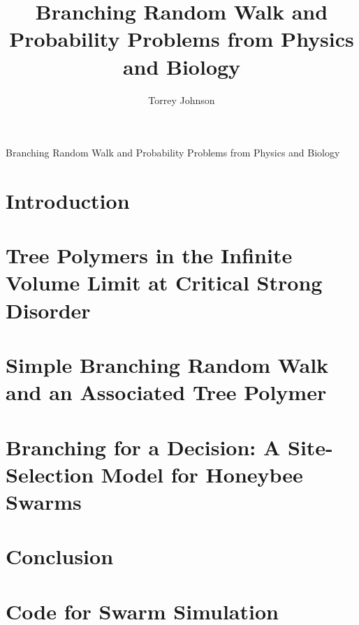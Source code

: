 \documentclass[double,12pt]{beavtex}
\title{Branching Random Walk and Probability Problems from Physics and Biology}
\author{Torrey Johnson}
\begin{document}
\maketitle

\mainmatter

\begingroup
\let\clearpage\relax
\begin{center}
\large
Branching Random Walk and Probability Problems
from Physics and Biology
\normalsize
\end{center}
\chapter{Introduction}

\endgroup

%

\chapter{Tree Polymers in the Infinite Volume Limit at Critical Strong Disorder}


\chapter{Simple Branching Random Walk and an Associated Tree Polymer}


\chapter{Branching for a Decision: A Site-Selection Model for Honeybee Swarms}


\chapter{Conclusion}





\appendix
\chapter{Code for Swarm Simulation}

\end{document}
